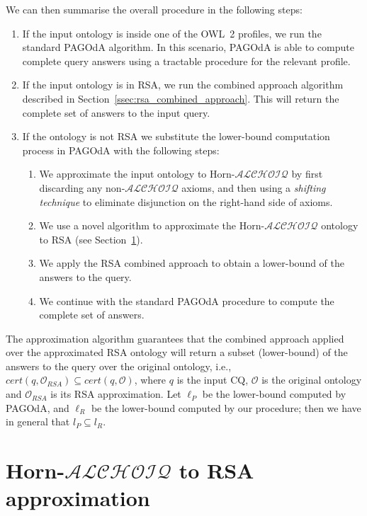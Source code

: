 \documentclass[runningheads]{llncs}
\newcommand{\alchoiq}{$\mathcal{ALCHOIQ}$\xspace}
\newcommand{\hornalchoiq}{Horn-\alchoiq\xspace}
\newcommand{\pagoda}{\mbox{PAGOdA}\xspace}
\begin{document}
We can then summarise the overall procedure in the following steps:
\begin{enumerate}
    \item
        If the input ontology is inside one of the OWL~2 profiles, we run the standard \pagoda algorithm.
        In this scenario, \pagoda is able to compute complete query answers using a tractable procedure for
        the relevant profile.
    \item
        If the input ontology is in RSA, we run the combined approach algorithm described in Section~\ref{ssec:rsa_combined_approach}.
        This will return the complete set of answers to the input query.
    \item
        If the ontology is not RSA we substitute the lower-bound computation process in \pagoda with the following steps:
        \begin{enumerate}
            \item
                We approximate the input ontology to \hornalchoiq by first discarding any non-\alchoiq axioms, and then using a \emph{shifting technique} to eliminate disjunction on the right-hand side of axioms.
            \item
                We use a novel algorithm to approximate the \hornalchoiq ontology to RSA (see Section~\ref{sec:hornalchoiq_to_rsa_approximation}).
            \item
                We apply the RSA combined approach to obtain a lower-bound of the answers to the query.
            \item
                We continue with the standard \pagoda procedure to compute the complete set of answers.
        \end{enumerate}
\end{enumerate}

The approximation algorithm guarantees that the combined approach applied over the approximated RSA ontology will return a subset (lower-bound) of the answers to the query over the original ontology, i.e., $\textit{cert}(q,\mathcal{O}_{RSA}) \subseteq \textit{cert}(q,\mathcal{O})$, where $q$ is the input CQ, $\mathcal{O}$ is the original ontology and $\mathcal{O}_{RSA}$ is its RSA approximation.
Let $\ell_{P}$ be the lower-bound computed by \pagoda, and $\ell_{R}$ be the lower-bound computed by our procedure; then we have in general that $l_{P} \subseteq l_{R}$.

\section{\hornalchoiq to RSA approximation}\label{sec:hornalchoiq_to_rsa_approximation}
 
\end{document}
